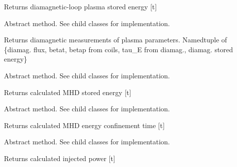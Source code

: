 \documentclass[letterpaper,10pt,english]{sphinxmanual}
\begin{document}
\begin{fulllineitems}
\begin{fulllineitems}
Returns diamagnetic-loop plasma stored energy {[}t{]}

\end{fulllineitems}


\begin{fulllineitems}
\label{eqtools:eqtools.core.Equilibrium.getDiamag}
Abstract method.  See child classes for implementation.

Returns diamagnetic measurements of plasma parameters.
Namedtuple of \{diamag. flux, betat, betap from coils, tau\_E from diamag., diamag. stored energy\}

\end{fulllineitems}


\begin{fulllineitems}
\label{eqtools:eqtools.core.Equilibrium.getWMHD}
Abstract method.  See child classes for implementation.

Returns calculated MHD stored energy {[}t{]}

\end{fulllineitems}


\begin{fulllineitems}
\label{eqtools:eqtools.core.Equilibrium.getTauMHD}
Abstract method.  See child classes for implementation.

Returns calculated MHD energy confinement time {[}t{]}

\end{fulllineitems}


\begin{fulllineitems}
\label{eqtools:eqtools.core.Equilibrium.getPinj}
Abstract method.  See child classes for implementation.

Returns calculated injected power {[}t{]}

\end{fulllineitems}



\end{fulllineitems}
\end{document}
